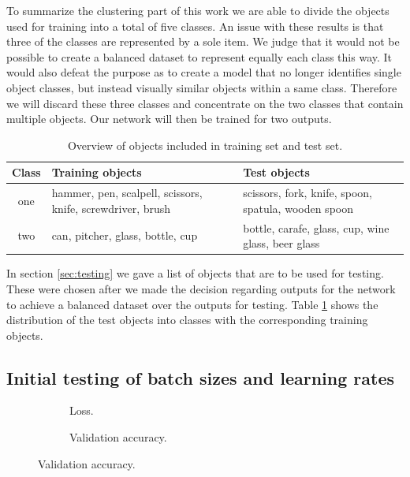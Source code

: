 To summarize the clustering part of this work we are able to divide the objects used for training into a total of five classes. An issue with these results is that three of the classes are represented by a sole item. We judge that it would not be possible to create a balanced dataset to represent equally each class this way. It would also defeat the purpose as to create a model that no longer identifies single object classes, but instead visually similar objects within a same class. Therefore we will discard these three classes and concentrate on the two classes that contain multiple objects. Our network will then be trained for two outputs.

\begin{table}
	\begin{tabular}{|c|p{5cm}|p{5cm}|}
		\hline
		Class & Training objects & Test objects \\
		\hline
		one & hammer, pen, scalpell, scissors, knife, screwdriver, brush & scissors, fork, knife, spoon, spatula, wooden spoon \\
		\hline
		two & can, pitcher, glass, bottle, cup & bottle, carafe, glass, cup, wine glass, beer glass \\
		\hline
	\end{tabular}
	\caption{Overview of objects included in training set and test set.}
	\label{tab:classification_objects}
\end{table}

In section \ref{sec:testing} we gave a list of objects that are to be used for testing. These were chosen after we made the decision regarding outputs for the network to achieve a balanced dataset over the outputs for testing. Table \ref{tab:classification_objects} shows the distribution of the test objects into classes with the corresponding training objects.


\subsection{Initial testing of batch sizes and learning rates}

\begin{figure}
	\begin{subfigure}[b]{\textwidth}
		
		\caption{Loss.}
	\end{subfigure}

	\begin{subfigure}[b]{\textwidth}
		
		\caption{Validation accuracy.}
	\end{subfigure}
\end{figure}

